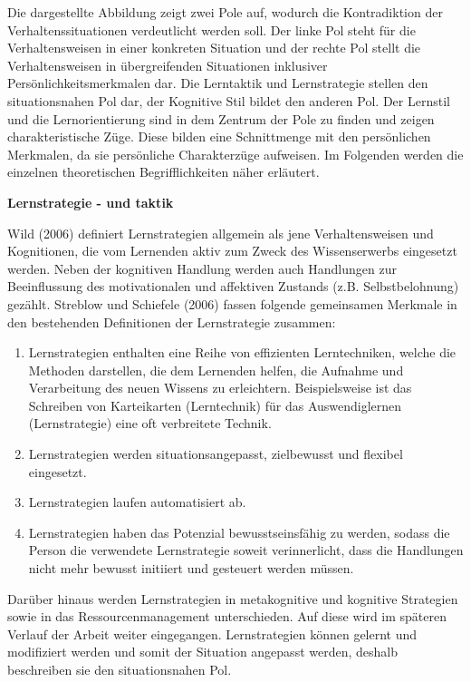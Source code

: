     Die dargestellte Abbildung zeigt zwei Pole auf, wodurch die Kontradiktion der Verhaltenssituationen verdeutlicht werden soll.
    Der linke Pol steht für die Verhaltensweisen in einer konkreten Situation und der rechte Pol stellt die Verhaltensweisen in übergreifenden Situationen inklusiver Persönlichkeitsmerkmalen dar.
    Die Lerntaktik und Lernstrategie stellen den situationsnahen Pol dar, der Kognitive Stil bildet den anderen Pol. Der Lernstil und die Lernorientierung sind in dem Zentrum der Pole zu finden und 
    zeigen charakteristische Züge. Diese bilden eine Schnittmenge mit den persönlichen Merkmalen, da sie persönliche Charakterzüge aufweisen.
    Im Folgenden werden die einzelnen theoretischen Begrifflichkeiten näher erläutert.

        \textbf{Lernstrategie - und taktik}

            Wild (2006) definiert Lernstrategien allgemein als \glqq jene Verhaltensweisen und Kognitionen, die vom Lernenden aktiv zum Zweck
            des Wissenserwerbs eingesetzt werden.\grqq{} \parencite[427]{Wild.2006} 
            Neben der kognitiven Handlung werden auch Handlungen zur Beeinflussung des motivationalen und affektiven Zustands (z.B. Selbstbelohnung) gezählt. \parencite[5]{Martin.2012} 
            Streblow und Schiefele (2006) fassen folgende gemeinsamen Merkmale in den bestehenden Definitionen der Lernstrategie zusammen:
        
            \begin{enumerate}
                \item Lernstrategien enthalten eine Reihe von effizienten Lerntechniken, welche die Methoden darstellen, die dem Lernenden helfen, die Aufnahme und Verarbeitung des neuen Wissens zu erleichtern. 
                            Beispielsweise ist das Schreiben von Karteikarten (Lerntechnik) für das Auswendiglernen (Lernstrategie) eine oft verbreitete Technik. 
                \item Lernstrategien werden situationsangepasst, zielbewusst und flexibel eingesetzt.
                \item Lernstrategien laufen automatisiert ab. 
                \item Lernstrategien haben das Potenzial bewusstseinsfähig zu werden, sodass die Person die verwendete Lernstrategie soweit verinnerlicht, dass die Handlungen nicht mehr bewusst initiiert und gesteuert werden müssen.
            \end{enumerate} 
            Darüber hinaus werden Lernstrategien in metakognitive und kognitive Strategien sowie in das Ressourcenmanagement unterschieden. \parencite[353]{Streblow.2006} 
            Auf diese wird im späteren Verlauf der Arbeit weiter eingegangen.
            Lernstrategien können gelernt und modifiziert werden und somit der Situation angepasst werden, deshalb beschreiben sie den situationsnahen Pol. \parencite[142]{Looss.2007}
       

